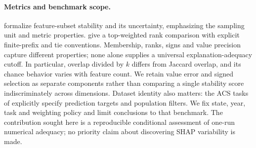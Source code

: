 \paragraph{Metrics and benchmark scope.}
\citet{nogueira2018} formalize feature-subset stability and its uncertainty, emphasizing the sampling unit and metric properties. \citet{webber2010} give a top-weighted rank comparison with explicit finite-prefix and tie conventions. Membership, ranks, signs and value precision capture different properties; none alone supplies a universal explanation-adequacy cutoff. In particular, overlap divided by $k$ differs from Jaccard overlap, and its chance behavior varies with feature count. We retain value error and signed selection as separate components rather than comparing a single stability score indiscriminately across dimensions. Dataset identity also matters: the ACS tasks of \citet{ding2021retiring} explicitly specify prediction targets and population filters. We fix state, year, task and weighting policy and limit conclusions to that benchmark. The contribution sought here is a reproducible conditional assessment of one-run numerical adequacy; no priority claim about discovering SHAP variability is made.
